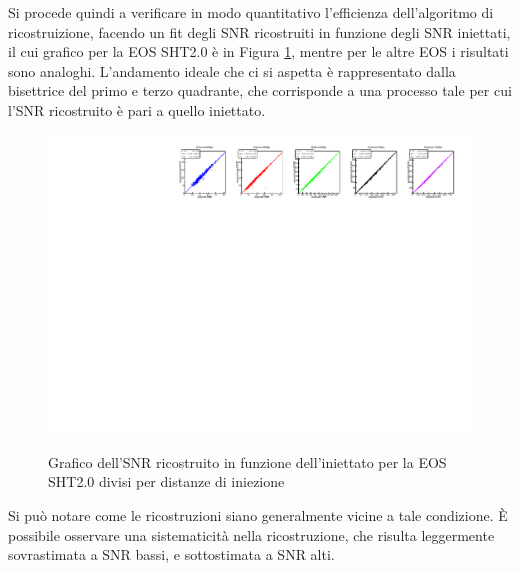 Si procede quindi a verificare in modo quantitativo l'efficienza dell'algoritmo di ricostruizione, facendo un fit degli SNR ricostruiti in funzione degli SNR iniettati, il cui grafico per la EOS SHT2.0 è in Figura \ref{fig:overlap}, mentre per le altre EOS i risultati sono analoghi. L'andamento ideale che ci si aspetta è rappresentato dalla bisettrice del primo e terzo quadrante, che corrisponde a una processo tale per cui l'SNR ricostruito è pari a quello iniettato.
\begin{figure}[hbt!]
	\centering
	{\includegraphics[width=1\textwidth]{figures/Capitolo_3/report/FITSHT2_0spin1.pdf}}
	\caption{Grafico dell'SNR ricostruito in funzione dell'iniettato per la EOS SHT2.0 divisi per distanze di iniezione}
	\label{fig:overlap}
\end{figure}
Si può notare come le ricostruzioni siano generalmente vicine a tale condizione. È possibile osservare una sistematicità nella ricostruzione, che risulta leggermente sovrastimata a SNR bassi, e sottostimata a SNR alti.

